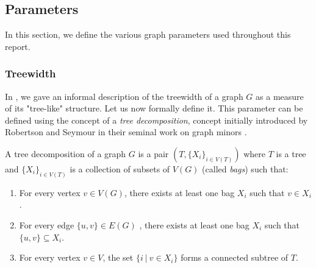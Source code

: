 
\begin{problem}
\end{problem}

\subsection{Parameters}

In this section, we define the various graph parameters used throughout this report.

\subsubsection*{Treewidth}

In , we gave an informal description of the treewidth of a graph $G$ as a measure of its "tree-like" structure. Let us now formally define it. This parameter can be defined using the concept of a \textit{tree decomposition}, concept initially introduced by Robertson and Seymour in their seminal work on graph minors \cite{robertson1986graph}.

\begin{definition}
    A tree decomposition of a graph $G$ is a pair $(T, \{X_i\}_{i \in V(T)})$ where $T$ is a tree and $\{X_i\}_{i \in V(T)}$ is a collection of subsets of $V(G)$ (called \emph{bags}) such that:
    \begin{enumerate}
        \item For every vertex $v \in V(G)$, there exists at least one bag $X_i$ such that $v \in X_i$.
        \item For every edge $\{u, v\} \in E(G)$ , there exists at least one bag $X_i$ such that $\{u, v\} \subseteq X_i$.
        \item For every vertex $v \in V$, the set $\{i\ |\ v \in X_i\}$ forms a connected subtree of $T$.
    \end{enumerate}
\end{definition}


